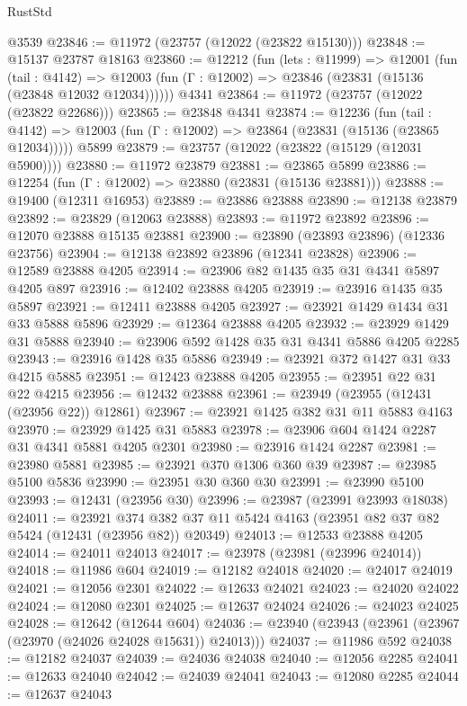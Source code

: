 \begin{lexlean}{RustStd}
\begin{coremodule}
    @3539
@23846 := @11972 (@23757 (@12022 (@23822 @15130)))
@23848 := @15137 @23787 @18163
@23860 := @12212
    (fun (lets : @11999) =>
    @12001
      (fun (tail : @4142) =>
      @12003 (fun (Γ : @12002) => @23846 (@23831 (@15136 (@23848 @12032 @12034))))))
    @4341
@23864 := @11972 (@23757 (@12022 (@23822 @22686)))
@23865 := @23848 @4341
@23874 := @12236
    (fun (tail : @4142) => @12003 (fun (Γ : @12002) => @23864 (@23831 (@15136 (@23865 @12034)))))
    @5899
@23879 := @23757 (@12022 (@23822 (@15129 (@12031 @5900))))
@23880 := @11972 @23879
@23881 := @23865 @5899
@23886 := @12254 (fun (Γ : @12002) => @23880 (@23831 (@15136 @23881)))
@23888 := @19400 (@12311 @16953)
@23889 := @23886 @23888
@23890 := @12138 @23879
@23892 := @23829 (@12063 @23888)
@23893 := @11972 @23892
@23896 := @12070 @23888 @15135 @23881
@23900 := @23890 (@23893 @23896) (@12336 @23756)
@23904 := @12138 @23892 @23896 (@12341 @23828)
@23906 := @12589 @23888 @4205
@23914 := @23906 @82 @1435 @35 @31 @4341 @5897 @4205 @897
@23916 := @12402 @23888 @4205
@23919 := @23916 @1435 @35 @5897
@23921 := @12411 @23888 @4205
@23927 := @23921 @1429 @1434 @31 @33 @5888 @5896
@23929 := @12364 @23888 @4205
@23932 := @23929 @1429 @31 @5888
@23940 := @23906 @592 @1428 @35 @31 @4341 @5886 @4205 @2285
@23943 := @23916 @1428 @35 @5886
@23949 := @23921 @372 @1427 @31 @33 @4215 @5885
@23951 := @12423 @23888 @4205
@23955 := @23951 @22 @31 @22 @4215
@23956 := @12432 @23888
@23961 := @23949 (@23955 (@12431 (@23956 @22)) @12861)
@23967 := @23921 @1425 @382 @31 @11 @5883 @4163
@23970 := @23929 @1425 @31 @5883
@23978 := @23906 @604 @1424 @2287 @31 @4341 @5881 @4205 @2301
@23980 := @23916 @1424 @2287
@23981 := @23980 @5881
@23985 := @23921 @370 @1306 @360 @39
@23987 := @23985 @5100 @5836
@23990 := @23951 @30 @360 @30
@23991 := @23990 @5100
@23993 := @12431 (@23956 @30)
@23996 := @23987 (@23991 @23993 @18038)
@24011 := @23921
    @374
    @382
    @37
    @11
    @5424
    @4163
    (@23951 @82 @37 @82 @5424 (@12431 (@23956 @82)) @20349)
@24013 := @12533 @23888 @4205
@24014 := @24011 @24013
@24017 := @23978 (@23981 (@23996 @24014))
@24018 := @11986 @604
@24019 := @12182 @24018
@24020 := @24017 @24019
@24021 := @12056 @2301
@24022 := @12633 @24021
@24023 := @24020 @24022
@24024 := @12080 @2301
@24025 := @12637 @24024
@24026 := @24023 @24025
@24028 := @12642 (@12644 @604)
@24036 := @23940 (@23943 (@23961 (@23967 (@23970 (@24026 @24028 @15631)) @24013)))
@24037 := @11986 @592
@24038 := @12182 @24037
@24039 := @24036 @24038
@24040 := @12056 @2285
@24041 := @12633 @24040
@24042 := @24039 @24041
@24043 := @12080 @2285
@24044 := @12637 @24043

\end{coremodule}
\end{lexlean}
